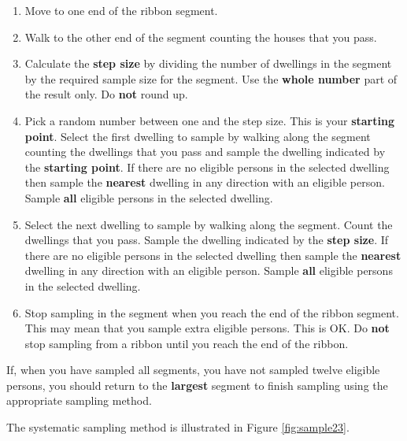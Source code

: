\documentclass[12pt,a4paper]{book}
\begin{document}
\begin{enumerate}
\def\labelenumi{\arabic{enumi}.}
\item
  Move to one end of the ribbon segment.
\item
  Walk to the other end of the segment counting the houses that you pass.
\item
  Calculate the \textbf{step size} by dividing the number of dwellings in the segment by the required sample size for the segment. Use the \textbf{whole number} part of the result only. Do \textbf{not} round up.
\item
  Pick a random number between one and the step size. This is your \textbf{starting point}. Select the first dwelling to sample by walking along the segment counting the dwellings that you pass and sample the dwelling indicated by the \textbf{starting point}. If there are no eligible persons in the selected dwelling then sample the \textbf{nearest} dwelling in any direction with an eligible person. Sample \textbf{all} eligible persons in the selected dwelling.
\item
  Select the next dwelling to sample by walking along the segment. Count the dwellings that you pass. Sample the dwelling indicated by the \textbf{step size}. If there are no eligible persons in the selected dwelling then sample the \textbf{nearest} dwelling in any direction with an eligible person. Sample \textbf{all} eligible persons in the selected dwelling.
\item
  Stop sampling in the segment when you reach the end of the ribbon segment. This may mean that you sample extra eligible persons. This is OK. Do \textbf{not} stop sampling from a ribbon until you reach the end of the ribbon.
\end{enumerate}

If, when you have sampled all segments, you have not sampled twelve eligible persons, you should return to the \textbf{largest} segment to finish sampling using the appropriate sampling method.

The systematic sampling method is illustrated in Figure \ref{fig:sample23}.
\end{document}
